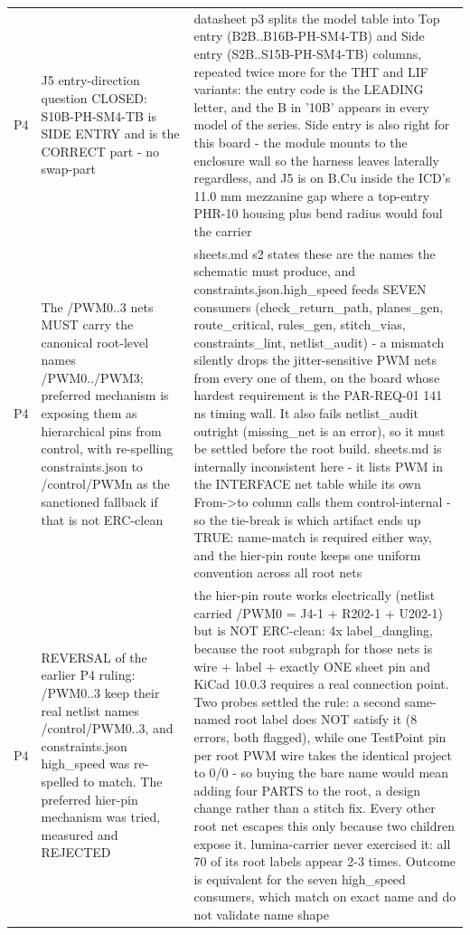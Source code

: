 \documentclass[11pt,a4paper]{article}
\begin{document}
{\begin{longtable}{lp{5.2cm}p{7.2cm}}
P4 & J5 entry-direction question CLOSED: S10B-PH-SM4-TB is SIDE ENTRY and is the CORRECT part - no swap-part & datasheet p3 splits the model table into Top entry (B2B..B16B-PH-SM4-TB) and Side entry (S2B..S15B-PH-SM4-TB) columns, repeated twice more for the THT and LIF variants: the entry code is the LEADING letter, and the B in '10B' appears in every model of the series. Side entry is also right for this board - the module mounts to the enclosure wall so the harness leaves laterally regardless, and J5 is on B.Cu inside the ICD's 11.0 mm mezzanine gap where a top-entry PHR-10 housing plus bend radius would foul the carrier \\
P4 & The /PWM0..3 nets MUST carry the canonical root-level names /PWM0../PWM3; preferred mechanism is exposing them as hierarchical pins from control, with re-spelling constraints.json to /control/PWMn as the sanctioned fallback if that is not ERC-clean & sheets.md s2 states these are the names the schematic must produce, and constraints.json.high\_speed feeds SEVEN consumers (check\_return\_path, planes\_gen, route\_critical, rules\_gen, stitch\_vias, constraints\_lint, netlist\_audit) - a mismatch silently drops the jitter-sensitive PWM nets from every one of them, on the board whose hardest requirement is the PAR-REQ-01 141 ns timing wall. It also fails netlist\_audit outright (missing\_net is an error), so it must be settled before the root build. sheets.md is internally inconsistent here - it lists PWM in the INTERFACE net table while its own From-\textgreater{}to column calls them control-internal - so the tie-break is which artifact ends up TRUE: name-match is required either way, and the hier-pin route keeps one uniform convention across all root nets \\
P4 & REVERSAL of the earlier P4 ruling: /PWM0..3 keep their real netlist names /control/PWM0..3, and constraints.json high\_speed was re-spelled to match. The preferred hier-pin mechanism was tried, measured and REJECTED & the hier-pin route works electrically (netlist carried /PWM0 = J4-1 + R202-1 + U202-1) but is NOT ERC-clean: 4x label\_dangling, because the root subgraph for those nets is wire + label + exactly ONE sheet pin and KiCad 10.0.3 requires a real connection point. Two probes settled the rule: a second same-named root label does NOT satisfy it (8 errors, both flagged), while one TestPoint pin per root PWM wire takes the identical project to 0/0 - so buying the bare name would mean adding four PARTS to the root, a design change rather than a stitch fix. Every other root net escapes this only because two children expose it. lumina-carrier never exercised it: all 70 of its root labels appear 2-3 times. Outcome is equivalent for the seven high\_speed consumers, which match on exact name and do not validate name shape \\

\end{longtable}}
\end{document}
